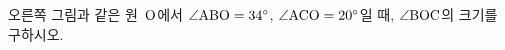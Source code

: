 \noindent\begin{minipage}[t]{0.58\linewidth}\vspace{0pt}\raggedright 오른쪽 그림과 같은 원~$\mathrm{O}$에서 $\angle\mathrm{ABO}=34^\circ$, $\angle\mathrm{ACO}=20^\circ$일 때, $\angle\mathrm{BOC}$의 크기를 구하시오.\end{minipage}\hfill\begin{minipage}[t]{0.4\linewidth}\vspace{0pt}\centering \resizebox{\ifdim\width>\linewidth\linewidth\else\width\fi}{!}{}\end{minipage}\par
